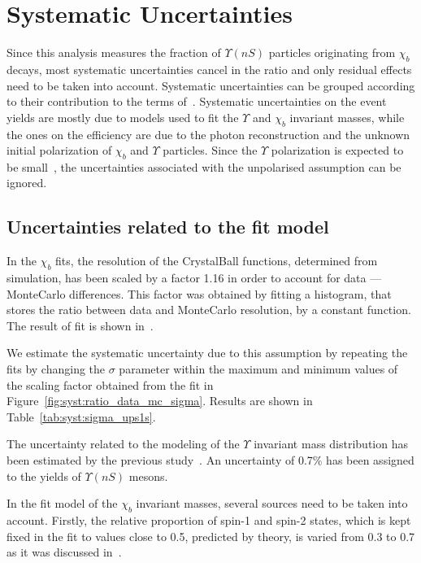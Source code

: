 \section[Systematic]{Systematic Uncertainties}
\label{sec:syst}

Since this analysis measures the fraction of $\Upsilon(nS)$ particles
originating from $\chi_b$ decays, most systematic uncertainties cancel in the
ratio and only residual effects need to be taken into account. Systematic
uncertainties can be grouped according to their contribution to the terms
of~. Systematic uncertainties on the event yields are mostly
due to models used to fit the $\Upsilon$ and $\chi_b$ invariant masses, while
the ones on the efficiency are due to the photon reconstruction and the unknown
initial polarization of $\chi_b$ and $\Upsilon$ particles. Since the $\Upsilon$
polarization is expected to be small~\cite{Aaij:2013yaa,Aaij:2014nwa}, the
uncertainties associated with the unpolarised assumption can be ignored. 
 

\subsection{Uncertainties related to the fit model}

In the $\chi_b$ fits, the resolution of the CrystalBall functions, determined
from simulation, has been scaled by a factor 1.16 in order to account for data
--- MonteCarlo differences. This factor was obtained by fitting a histogram,
that stores the ratio between data and MonteCarlo resolution, by a constant
function. The result of fit is shown in~.
 
% 


We estimate the systematic uncertainty due to this assumption by repeating the
fits by changing the $\sigma$ parameter within the maximum and minimum values of
the scaling factor obtained from the fit in Figure~\ref{fig:syst:ratio_data_mc_sigma}.
Results are shown in Table~\ref{tab:syst:sigma_ups1s}.


The uncertainty related to the modeling of the $\Upsilon$ invariant mass
distribution has been estimated by the previous
study~\cite{Aaij:2013yaa}. An uncertainty of 0.7\% has been assigned to the
yields of $\Upsilon(nS)$ mesons.

In the fit model of the $\chi_b$ invariant masses, several sources need to be
taken into account. Firstly, the relative proportion of spin-1 and spin-2
states, which is kept fixed in the fit to values close to 0.5, predicted by
theory, is varied from 0.3 to 0.7 as it was discussed in~.


